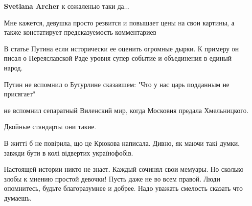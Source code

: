 \begin{itemize}
\begin{itemize}
\textbf{Svetlana Archer} к сожаленью таки да... 🙁
\end{itemize}

 
Мне кажется, девушка просто резвится и повышает цены на свои картины, а также констатирует предсказуемость комментариев

 

В статье Путина если исторически ее оценить огромные дырки. К примеру он писал
о Переяславской Раде уровня супер событие и объединения в единый народ.

Путин не вспомнил о Бутурлине сказавшем: "Что у нас царь подданным не
присягает"

не вспомнил сепаратный Виленский мир, когда Московия предала Хмельницкого.

Двойные стандарты они такие.

 
В житті б не повірила, що це Крюкова написала. Дивно, як маючи такі думки, завжди бути в колі відвертих українофобів.

 

Настоящей истории никто не знает. Каждый сочинял свои мемуары. Но сколько злобы
к мнению простой девочки! Пусть даже не во всем правой. Люди опомнитесь,
будьте благоразумнее и добрее. Надо уважать смелость сказать что думаешь.

 

\end{itemize}
